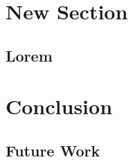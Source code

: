 \documentclass[10pt]{report}
\numberwithin{figure}{section}
\numberwithin{table}{section}
\begin{document}
\newpage
\section{New Section}
\subsection{Lorem}

\newpage
\section{Conclusion}
\subsection{Future Work}



\newpage
\printbibliography[title = {References}]
\end{document}
